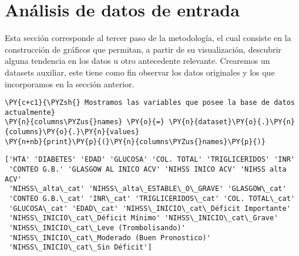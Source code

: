     \hypertarget{anuxe1lisis-de-datos-de-entrada}{%
\section{Análisis de datos de entrada}\label{anuxe1lisis-de-datos-de-entrada}}

Esta sección corresponde al tercer paso de la metodología, el cual consiste en la construcción de gráficos que permitan, a partir de su visualización, descubrir alguna tendencia en los datos u otro antecedente relevante. Crearemos un datasets auxiliar, este tiene como fin observar los datos originales y los que incorporamos en la sección anterior.

    \begin{tcolorbox}[breakable, size=fbox, boxrule=1pt, pad at break*=1mm,colback=cellbackground, colframe=cellborder]
\begin{Verbatim}[commandchars=\\\{\}]
\PY{c+c1}{\PYZsh{} Mostramos las variables que posee la base de datos actualmente}
\PY{n}{columns\PYZus{}names} \PY{o}{=} \PY{n}{dataset}\PY{o}{.}\PY{n}{columns}\PY{o}{.}\PY{n}{values}
\PY{n+nb}{print}\PY{p}{(}\PY{n}{columns\PYZus{}names}\PY{p}{)}
\end{Verbatim}
\end{tcolorbox}

    \begin{Verbatim}[commandchars=\\\{\}]
['HTA' 'DIABETES' 'EDAD' 'GLUCOSA' 'COL. TOTAL' 'TRIGLICERIDOS' 'INR'
 'CONTEO G.B.' 'GLASGOW AL INICO ACV' 'NIHSS INICO ACV' 'NIHSS alta ACV'
 'NIHSS\_alta\_cat' 'NIHSS\_alta\_ESTABLE\_O\_GRAVE' 'GLASGOW\_cat'
 'CONTEO G.B.\_cat' 'INR\_cat' 'TRIGLICERIDOS\_cat' 'COL. TOTAL\_cat'
 'GLUCOSA\_cat' 'EDAD\_cat' 'NIHSS\_INICIO\_cat\_Déficit Importante'
 'NIHSS\_INICIO\_cat\_Déficit Mínimo' 'NIHSS\_INICIO\_cat\_Grave'
 'NIHSS\_INICIO\_cat\_Leve (Trombolisando)'
 'NIHSS\_INICIO\_cat\_Moderado (Buen Pronostico)'
 'NIHSS\_INICIO\_cat\_Sin Déficit']
    \end{Verbatim}

